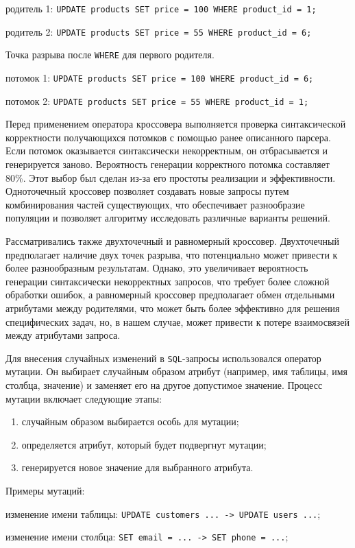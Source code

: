 \documentclass[master,paper]{pmk-graduate}
\begin{document}
родитель 1: \texttt{UPDATE products SET price = 100 WHERE product\_id = 1;}

родитель 2: \texttt{UPDATE products SET price = 55 WHERE product\_id = 6;}

Точка разрыва после \texttt{WHERE} для первого родителя.

потомок 1: \texttt{UPDATE products SET price = 100 WHERE product\_id = 6;}

потомок 2: \texttt{UPDATE products SET price = 55 WHERE product\_id = 1;}

Перед применением оператора кроссовера выполняется проверка синтаксической корректности получающихся потомков с помощью ранее описанного парсера.
Если потомок оказывается синтаксически некорректным, он отбрасывается и генерируется заново. Вероятность генерации корректного потомка составляет 80\%.
Этот выбор был сделан из-за его простоты реализации и эффективности. Одноточечный кроссовер позволяет создавать новые запросы путем комбинирования частей существующих, что обеспечивает разнообразие популяции и позволяет алгоритму исследовать различные варианты решений.

Рассматривались также двухточечный и равномерный кроссовер. Двухточечный предполагает наличие двух точек разрыва, что потенциально может привести к более разнообразным результатам. Однако, это увеличивает ве\-роятность генерации синтаксически некорректных запросов, что требует более сложной обработки ошибок, а равномерный кроссовер предполагает обмен отдельными атрибутами между родителями, что может быть более эффективно для решения специфических задач, но, в нашем случае, может привести к потере взаимосвязей между атрибутами запроса.

Для внесения случайных изменений в \texttt{SQL}-запросы использовался оператор мутации. Он выбирает случайным образом атрибут (например, имя таблицы, имя столбца, значение) и заменяет его на другое допустимое значение. Процесс мутации включает следующие этапы:
\begin{enumerate}
\item случайным образом выбирается особь для мутации;
\item определяется атрибут, который будет подвергнут мутации;
\item генерируется новое значение для выбранного атрибута.
\end{enumerate}
Примеры мутаций:

изменение имени таблицы: \texttt{UPDATE customers ... -> UPDATE users ...};

изменение имени столбца: \texttt{SET email = ... -> SET phone = ...};
\end{document}
